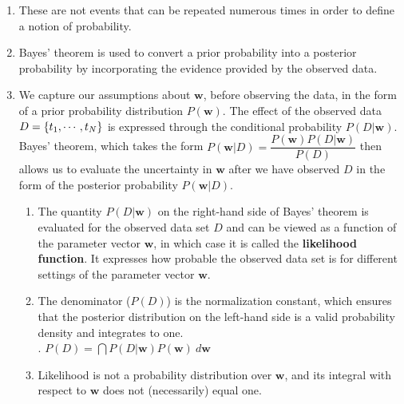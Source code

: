 \begin{enumerate}
    \item These are not events that can be repeated numerous times in order to define a notion of probability.
    \hfill \cite{ml/book/Pattern-Recognition-And-Machine-Learning/Christopher-M-Bishop}

    \item Bayes' theorem is used to convert a prior probability into a posterior probability by incorporating the evidence provided by the observed data.
    \hfill \cite{ml/book/Pattern-Recognition-And-Machine-Learning/Christopher-M-Bishop}

    \item We capture our assumptions about $\bm{w}$, before observing the data, in the form of a prior probability distribution $P(\bm{w})$.
    The effect of the observed data $D = \left\{t_1, \cdots , t_N \right\}$ is expressed through the conditional probability $P(D|\bm{w})$.
    Bayes’ theorem, which takes the form
    $
        P(\bm{w}|D) = \dfrac{P(\bm{w})P(D|\bm{w})}{P(D)}
    $
    then allows us to evaluate the uncertainty in $\bm{w}$ after we have observed $D$ in the form of the posterior probability $P(\bm{w}|D)$.
    \hfill \cite{ml/book/Pattern-Recognition-And-Machine-Learning/Christopher-M-Bishop}
    \begin{enumerate}
        \item The quantity $P(D|\bm{w})$ on the right-hand side of Bayes' theorem is evaluated for the observed data set $D$ and can be viewed as a function of the parameter vector $\bm{w}$, in which case it is called the \textbf{likelihood function}.
        It expresses how probable the observed data set is for different settings of the parameter vector $\bm{w}$.
        \hfill \cite{ml/book/Pattern-Recognition-And-Machine-Learning/Christopher-M-Bishop}

        \item The denominator ($P(D)$) is the normalization constant, which ensures that the posterior distribution on the left-hand side is a valid probability density and integrates to one.
        \hfill \cite{ml/book/Pattern-Recognition-And-Machine-Learning/Christopher-M-Bishop}
        \\
        .\hfill
        $
            P(D) = \dint P(D|\bm{w})P(\bm{w})\ d\bm{w}
        $
        \hfill \cite{ml/book/Pattern-Recognition-And-Machine-Learning/Christopher-M-Bishop}

        \item Likelihood is not a probability distribution over $\bm{w}$, and its integral with respect to $\bm{w}$ does not (necessarily) equal one.
        \hfill \cite{ml/book/Pattern-Recognition-And-Machine-Learning/Christopher-M-Bishop}


\end{enumerate}
\end{enumerate}
